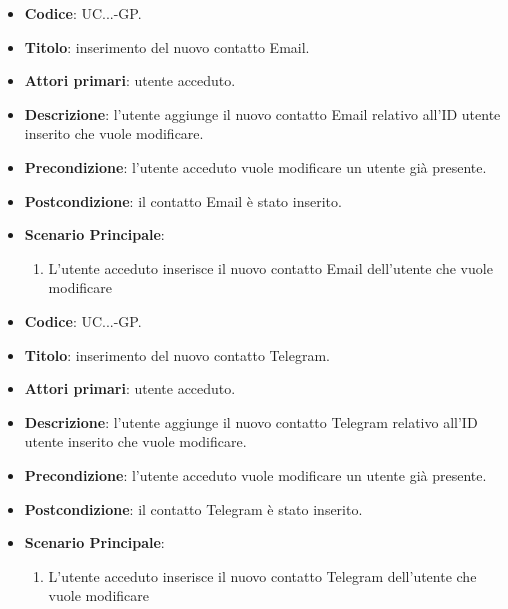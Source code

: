 				
				\begin{itemize}
					\item \textbf{Codice}: UC\theuccount.\thesubuccount.\thesubsubuccount.\thesubsubsubuccount-GP.
					\item \textbf{Titolo}: inserimento del nuovo contatto Email.
					\item \textbf{Attori primari}: utente acceduto.
					\item \textbf{Descrizione}: l'utente aggiunge il nuovo contatto Email relativo all'ID utente inserito che vuole modificare.
					\item \textbf{Precondizione}: l'utente acceduto vuole modificare un utente già presente.
					\item \textbf{Postcondizione}: il contatto Email è stato inserito.
					\item \textbf{Scenario Principale}:
					\begin{enumerate}
						\item L'utente acceduto inserisce il nuovo contatto Email dell'utente che vuole modificare
					\end{enumerate}
				\end{itemize}
			
				
				\begin{itemize}
					\item \textbf{Codice}: UC\theuccount.\thesubuccount.\thesubsubuccount.\thesubsubsubuccount-GP.
					\item \textbf{Titolo}: inserimento del nuovo contatto Telegram.
					\item \textbf{Attori primari}: utente acceduto.
					\item \textbf{Descrizione}: l'utente aggiunge il nuovo contatto Telegram relativo all'ID utente inserito che vuole modificare.
					\item \textbf{Precondizione}: l'utente acceduto vuole modificare un utente già presente.
					\item \textbf{Postcondizione}: il contatto Telegram è stato inserito.
					\item \textbf{Scenario Principale}:
					\begin{enumerate}
						\item L'utente acceduto inserisce il nuovo contatto Telegram dell'utente che vuole modificare
					\end{enumerate}
				\end{itemize}
			
